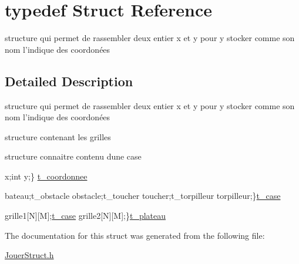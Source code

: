 \hypertarget{structtypedef}{}\section{typedef Struct Reference}
\label{structtypedef}


structure qui permet de rassembler deux entier x et y pour y stocker comme son nom l’indique des coordonées  




\subsection{Detailed Description}
structure qui permet de rassembler deux entier x et y pour y stocker comme son nom l’indique des coordonées 

structure contenant les grilles

structure connaitre contenu d\textquotesingle{}une case

x;int y;\} \hyperlink{structt__coordonnee}{t\+\_\+coordonnee}

bateau;t\+\_\+obstacle obstacle;t\+\_\+toucher toucher;t\+\_\+torpilleur torpilleur;\}\hyperlink{structt__case}{t\+\_\+case}

grille1\mbox{[}N\mbox{]}\mbox{[}M\mbox{]};\hyperlink{structt__case}{t\+\_\+case} grille2\mbox{[}N\mbox{]}\mbox{[}M\mbox{]};\}\hyperlink{structt__plateau}{t\+\_\+plateau} 

The documentation for this struct was generated from the following file\+:\begin{DoxyCompactItemize}
\item 
\hyperlink{_jouer_struct_8h}{Jouer\+Struct.\+h}\end{DoxyCompactItemize}
